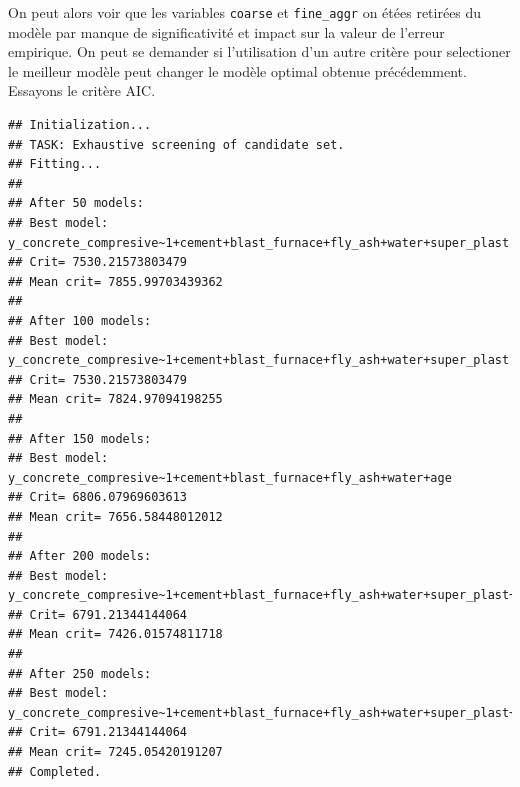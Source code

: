 \documentclass[
  12pt,
]{article}
\begin{document}
On peut alors voir que les variables \texttt{coarse} et
\texttt{fine\_aggr} on étées retirées du modèle par manque de
significativité et impact sur la valeur de l'erreur empirique. On peut
se demander si l'utilisation d'un autre critère pour selectioner le
meilleur modèle peut changer le modèle optimal obtenue précédemment.
Essayons le critère AIC.

\begin{verbatim}
## Initialization...
## TASK: Exhaustive screening of candidate set.
## Fitting...
## 
## After 50 models:
## Best model: y_concrete_compresive~1+cement+blast_furnace+fly_ash+water+super_plast
## Crit= 7530.21573803479
## Mean crit= 7855.99703439362
## 
## After 100 models:
## Best model: y_concrete_compresive~1+cement+blast_furnace+fly_ash+water+super_plast
## Crit= 7530.21573803479
## Mean crit= 7824.97094198255
## 
## After 150 models:
## Best model: y_concrete_compresive~1+cement+blast_furnace+fly_ash+water+age
## Crit= 6806.07969603613
## Mean crit= 7656.58448012012
## 
## After 200 models:
## Best model: y_concrete_compresive~1+cement+blast_furnace+fly_ash+water+super_plast+age
## Crit= 6791.21344144064
## Mean crit= 7426.01574811718
## 
## After 250 models:
## Best model: y_concrete_compresive~1+cement+blast_furnace+fly_ash+water+super_plast+age
## Crit= 6791.21344144064
## Mean crit= 7245.05420191207
## Completed.
\end{verbatim}
\end{document}
